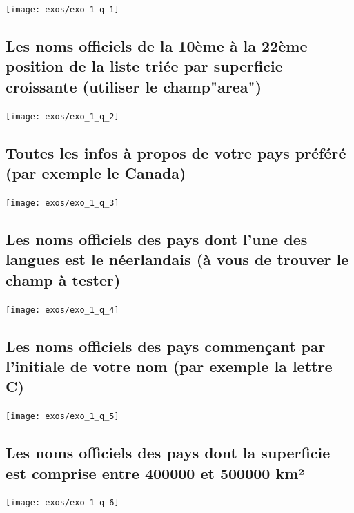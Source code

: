 \documentclass[12pt,a4paper]{article}
\begin{document}
\begin{center}
	\texttt{[image: exos/exo\_1\_q\_1]}
\end{center}

\subsection{Les noms officiels de la 10ème à la 22ème position de la liste triée par superficie croissante (utiliser le champ"area")}

\begin{center}
	\texttt{[image: exos/exo\_1\_q\_2]}
\end{center}

\subsection{Toutes les infos à propos de votre pays préféré (par exemple le Canada)}

\begin{center}
	\texttt{[image: exos/exo\_1\_q\_3]}
\end{center}

\subsection{Les noms officiels des pays dont l'une des langues est le néerlandais (à vous de trouver le champ à tester)}

\begin{center}
	\texttt{[image: exos/exo\_1\_q\_4]}
\end{center}

\subsection{Les noms officiels des pays commençant par l'initiale de votre nom (par exemple la lettre C)}

\begin{center}
	\texttt{[image: exos/exo\_1\_q\_5]}
\end{center}

\subsection{Les noms officiels des pays dont la superficie est comprise entre 400000 et 500000 km²}

\begin{center}
	\texttt{[image: exos/exo\_1\_q\_6]}
\end{center}
\end{document}
